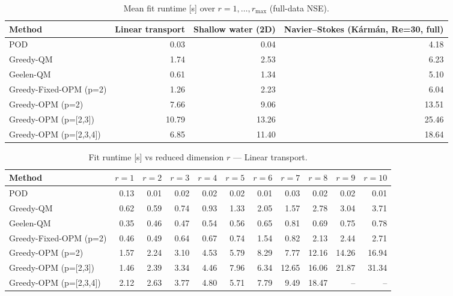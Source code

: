 \begin{table}[t]
\centering
\caption{Mean fit runtime [s] over $r=1,\dots,r_{\max}$ (full-data NSE).}
\label{tab:runtime-full-summary}
\small
\begin{tabular}{lrrr}
\toprule
\textbf{Method} & Linear transport & Shallow water (2D) & Navier--Stokes (K\'arm\'an, Re=30, full) \\
\midrule
POD & 0.03 & 0.04 & 4.18 \\
Greedy-QM & 1.74 & 2.53 & 6.23 \\
Geelen-QM & 0.61 & 1.34 & 5.10 \\
Greedy-Fixed-OPM (p=2) & 1.26 & 2.23 & 6.04 \\
Greedy-OPM (p=2) & 7.66 & 9.06 & 13.51 \\
Greedy-OPM (p=[2,3]) & 10.79 & 13.26 & 25.46 \\
Greedy-OPM (p=[2,3,4]) & 6.85 & 11.40 & 18.64 \\
\bottomrule
\end{tabular}
\end{table}

\begin{table}[t]
\centering
\caption{Fit runtime [s] vs reduced dimension $r$ --- Linear transport.}
\label{tab:runtime-full-transport}
\small
\begin{tabular}{lrrrrrrrrrr}
\toprule
\textbf{Method} & $r=1$ & $r=2$ & $r=3$ & $r=4$ & $r=5$ & $r=6$ & $r=7$ & $r=8$ & $r=9$ & $r=10$ \\
\midrule
POD & 0.13 & 0.01 & 0.02 & 0.02 & 0.02 & 0.01 & 0.03 & 0.02 & 0.02 & 0.01 \\
Greedy-QM & 0.62 & 0.59 & 0.74 & 0.93 & 1.33 & 2.05 & 1.57 & 2.78 & 3.04 & 3.71 \\
Geelen-QM & 0.35 & 0.46 & 0.47 & 0.54 & 0.56 & 0.65 & 0.81 & 0.69 & 0.75 & 0.78 \\
Greedy-Fixed-OPM (p=2) & 0.46 & 0.49 & 0.64 & 0.67 & 0.74 & 1.54 & 0.82 & 2.13 & 2.44 & 2.71 \\
Greedy-OPM (p=2) & 1.57 & 2.24 & 3.10 & 4.53 & 5.79 & 8.29 & 7.77 & 12.16 & 14.26 & 16.94 \\
Greedy-OPM (p=[2,3]) & 1.46 & 2.39 & 3.34 & 4.46 & 7.96 & 6.34 & 12.65 & 16.06 & 21.87 & 31.34 \\
Greedy-OPM (p=[2,3,4]) & 2.12 & 2.63 & 3.77 & 4.80 & 5.71 & 7.79 & 9.49 & 18.47 & -- & -- \\
\bottomrule
\end{tabular}
\end{table}

